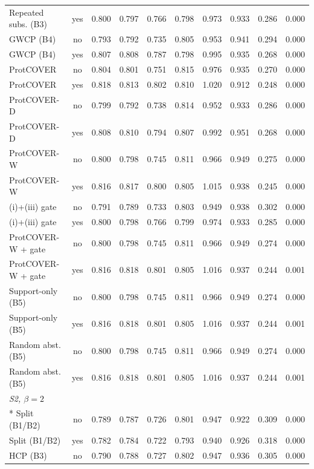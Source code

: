 \begin{longtable}{lccccccccc}
Repeated subs. (B3) & yes & 0.800 & 0.797 & 0.766 & 0.798 & 0.973 & 0.933 & 0.286 & 0.000 \\
GWCP (B4) & no & 0.793 & 0.792 & 0.735 & 0.805 & 0.953 & 0.941 & 0.294 & 0.000 \\
GWCP (B4) & yes & 0.807 & 0.808 & 0.787 & 0.798 & 0.995 & 0.935 & 0.268 & 0.000 \\
ProtCOVER & no & 0.804 & 0.801 & 0.751 & 0.815 & 0.976 & 0.935 & 0.270 & 0.000 \\
ProtCOVER & yes & 0.818 & 0.813 & 0.802 & 0.810 & 1.020 & 0.912 & 0.248 & 0.000 \\
ProtCOVER-D & no & 0.799 & 0.792 & 0.738 & 0.814 & 0.952 & 0.933 & 0.286 & 0.000 \\
ProtCOVER-D & yes & 0.808 & 0.810 & 0.794 & 0.807 & 0.992 & 0.951 & 0.268 & 0.000 \\
ProtCOVER-W & no & 0.800 & 0.798 & 0.745 & 0.811 & 0.966 & 0.949 & 0.275 & 0.000 \\
ProtCOVER-W & yes & 0.816 & 0.817 & 0.800 & 0.805 & 1.015 & 0.938 & 0.245 & 0.000 \\
(i)+(iii) gate & no & 0.791 & 0.789 & 0.733 & 0.803 & 0.949 & 0.938 & 0.302 & 0.000 \\
(i)+(iii) gate & yes & 0.800 & 0.798 & 0.766 & 0.799 & 0.974 & 0.933 & 0.285 & 0.000 \\
ProtCOVER-W + gate & no & 0.800 & 0.798 & 0.745 & 0.811 & 0.966 & 0.949 & 0.274 & 0.000 \\
ProtCOVER-W + gate & yes & 0.816 & 0.818 & 0.801 & 0.805 & 1.016 & 0.937 & 0.244 & 0.001 \\
Support-only (B5) & no & 0.800 & 0.798 & 0.745 & 0.811 & 0.966 & 0.949 & 0.274 & 0.000 \\
Support-only (B5) & yes & 0.816 & 0.818 & 0.801 & 0.805 & 1.016 & 0.937 & 0.244 & 0.001 \\
Random abst. (B5) & no & 0.800 & 0.798 & 0.745 & 0.811 & 0.966 & 0.949 & 0.274 & 0.000 \\
Random abst. (B5) & yes & 0.816 & 0.818 & 0.801 & 0.805 & 1.016 & 0.937 & 0.244 & 0.001 \\
\midrule
\multicolumn{10}{l}{\emph{S2, $\beta=2$}}\\*
Split (B1/B2) & no & 0.789 & 0.787 & 0.726 & 0.801 & 0.947 & 0.922 & 0.309 & 0.000 \\
Split (B1/B2) & yes & 0.782 & 0.784 & 0.722 & 0.793 & 0.940 & 0.926 & 0.318 & 0.000 \\
HCP (B3) & no & 0.790 & 0.788 & 0.727 & 0.802 & 0.947 & 0.936 & 0.305 & 0.000 \\

\end{longtable}
